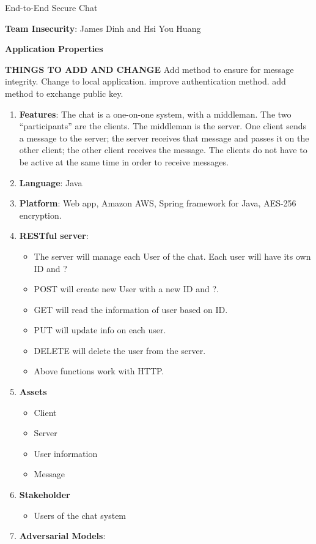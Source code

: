 \documentclass{article}
\begin{document}
End-to-End Secure Chat\newline

\textbf{Team Insecurity}: James Dinh and Hsi You Huang\newline

\textbf{Application Properties}\newline

\textbf{THINGS TO ADD AND CHANGE}
Add method to ensure for message integrity.\newline
Change to local application.\newline
improve authentication method.\newline
add method to exchange public key.\newline


\begin{enumerate}
	\item \textbf{Features}: The chat is a one-on-one system, with a middleman. The two
     “participants” are the clients. The middleman is the server. One client sends a message to the
     server; the server receives that message and passes it on the other client; the other client 
     receives the message. The clients do not have to be active at the same time in order to receive
     messages.
	\item \textbf{Language}: Java
    \item \textbf{Platform}: Web app, Amazon AWS, Spring framework for Java, AES-256 encryption.
    \item \textbf{RESTful server}:
    	\begin{itemize}
    		\item The server will manage each User of the chat. Each user will have its own ID and ?
         	\item POST will create new User with a new ID and ?.
            \item GET will read the information of user based on ID.
            \item PUT will update info on each user.
            \item DELETE will delete the user from the server.
            \item Above functions work with HTTP.
        \end{itemize}
	\item \textbf{Assets}
    	\begin{itemize}
        	\item Client
            \item Server
            \item User information
			\item Message
        \end{itemize} 
    \item \textbf{Stakeholder}
    	\begin{itemize}
        	\item Users of the chat system
        \end{itemize}
    \item \textbf{Adversarial Models}:
    	\begin {itemize}
  

\end{itemize}
\end{enumerate}
\end{document}
